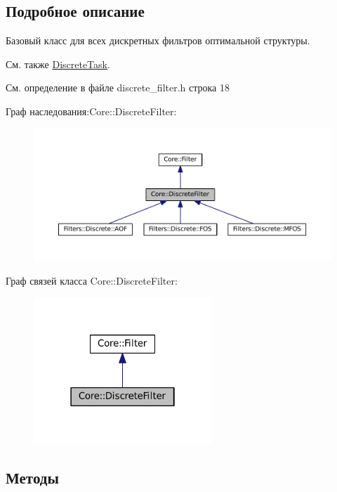 \subsection{Подробное описание}
Базовый класс для всех дискретных фильтров оптимальной структуры. 

\begin{DoxySeeAlso}{См. также}
\hyperlink{class_core_1_1_discrete_task}{Discrete\+Task}. 
\end{DoxySeeAlso}


См. определение в файле discrete\+\_\+filter.\+h строка 18



Граф наследования\+:Core\+:\+:Discrete\+Filter\+:\nopagebreak
\begin{figure}[H]
\begin{center}
\leavevmode
\includegraphics[width=350pt]{class_core_1_1_discrete_filter__inherit__graph}
\end{center}
\end{figure}


Граф связей класса Core\+:\+:Discrete\+Filter\+:\nopagebreak
\begin{figure}[H]
\begin{center}
\leavevmode
\includegraphics[width=190pt]{class_core_1_1_discrete_filter__coll__graph}
\end{center}
\end{figure}


\subsection{Методы}
\hypertarget{class_core_1_1_discrete_filter_a658617c64c7067bb6b98b5e9d78f982e}{}\label{class_core_1_1_discrete_filter_a658617c64c7067bb6b98b5e9d78f982e} 
